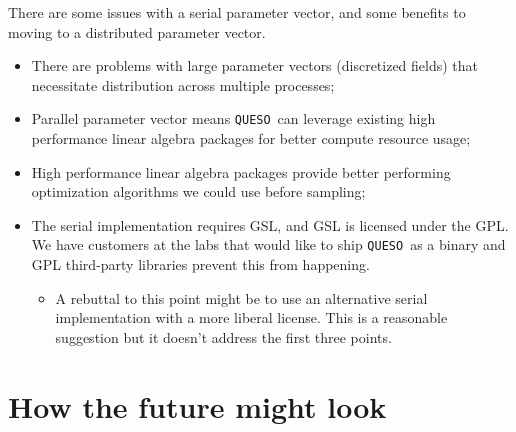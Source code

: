 \documentclass{article}
\newcommand{\Queso}{\texttt{QUESO}}
\begin{document}
There are some issues with a serial parameter vector, and some benefits to
moving to a distributed parameter vector.
\begin{itemize}
  \item There are problems with large parameter vectors (discretized fields)
    that necessitate distribution across multiple processes;
  \item Parallel parameter vector means \Queso\ can leverage existing high
    performance linear algebra packages for better compute resource usage;
  \item High performance linear algebra packages provide better performing
    optimization algorithms we could use before sampling;
  \item The serial implementation requires GSL, and GSL is licensed under the
    GPL.  We have customers at the labs that would like to ship \Queso\ as a
    binary and GPL third-party libraries prevent this from happening.
    \begin{itemize}
      \item A rebuttal to this point might be to use an alternative serial
        implementation with a more liberal license.  This is a reasonable
        suggestion but it doesn't address the first three points.
    \end{itemize}
\end{itemize}

\section{How the future might look}
\end{document}
